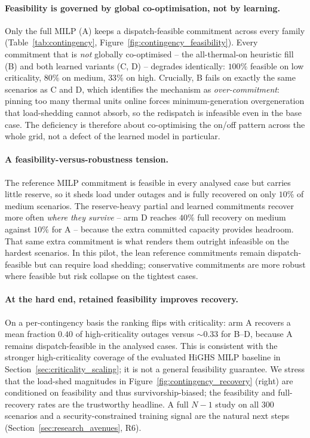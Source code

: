 \documentclass{article}
\begin{document}
\paragraph{Feasibility is governed by global co-optimisation, not by learning.} Only the full MILP (A) keeps a dispatch-feasible commitment across every family (Table~\ref{tab:contingency}, Figure~\ref{fig:contingency_feasibility}). Every commitment that is \emph{not} globally co-optimised -- the all-thermal-on heuristic fill (B) and both learned variants (C, D) -- degrades identically: $100\%$ feasible on low criticality, $80\%$ on medium, $33\%$ on high. Crucially, B fails on exactly the same scenarios as C and D, which identifies the mechanism as \emph{over-commitment}: pinning too many thermal units online forces minimum-generation overgeneration that load-shedding cannot absorb, so the redispatch is infeasible even in the base case. The deficiency is therefore about co-optimising the on/off pattern across the whole grid, not a defect of the learned model in particular.

\paragraph{A feasibility-versus-robustness tension.} The reference MILP commitment is feasible in every analysed case but carries little reserve, so it sheds load under outages and is fully recovered on only $10\%$ of medium scenarios. The reserve-heavy partial and learned commitments recover more often \emph{where they survive} -- arm D reaches $40\%$ full recovery on medium against $10\%$ for A -- because the extra committed capacity provides headroom. That same extra commitment is what renders them outright infeasible on the hardest scenarios. In this pilot, the lean reference commitments remain dispatch-feasible but can require load shedding; conservative commitments are more robust where feasible but risk collapse on the tightest cases.

\paragraph{At the hard end, retained feasibility improves recovery.} On a per-contingency basis the ranking flips with criticality: arm A recovers a mean fraction $0.40$ of high-criticality outages versus $\sim 0.33$ for B--D, because A remains dispatch-feasible in the analysed cases. This is consistent with the stronger high-criticality coverage of the evaluated HiGHS MILP baseline in Section~\ref{sec:criticality_scaling}; it is not a general feasibility guarantee. We stress that the load-shed magnitudes in Figure~\ref{fig:contingency_recovery} (right) are conditioned on feasibility and thus survivorship-biased; the feasibility and full-recovery rates are the trustworthy headline. A full $N{-}1$ study on all $300$ scenarios and a security-constrained training signal are the natural next steps (Section~\ref{sec:research_avenues}, R6).
\end{document}
